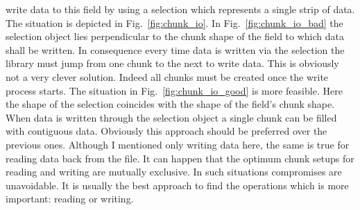 write data to this field by using a selection which represents a single strip of
data. The situation is depicted in Fig.~\ref{fig:chunk_io}.
In Fig.~\ref{fig:chunk_io_bad} the selection object lies perpendicular to the
chunk shape of the field to which data shall be written. 
In consequence every time data is written via the selection the library must
jump from one chunk to the next to write data. This is obviously not a very
clever solution. Indeed all chunks must be created once the write process
starts.
The situation in Fig.~\ref{fig:chunk_io_good} is more feasible. Here the shape
of the selection coincides with the shape of the field's chunk shape. 
When data is written through the selection object a single chunk can be filled
with contiguous data. Obviously this approach should be preferred over the
previous ones. Although I mentioned only writing data here, the same is true for
reading data back from the file. 
It can happen that the optimum chunk setups for reading and writing are mutually
exclusive. In such situations compromises are unavoidable. It is usually the
best approach to find the operations which is more important: reading or
writing.
 
